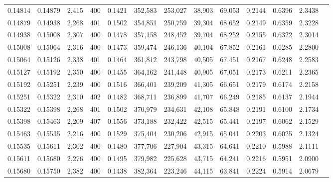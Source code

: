 \begin{tabular}{rrrrrrrrrrrrr}
0.14814 & 0.14879 & 2,415 & 400 &                                     0.1421 & 352,583 & 253,027 &  38,903 &  69,053 & 0.2144 & 0.6396 & 2.3438 \\
0.14879 & 0.14938 & 2,268 & 401 &                                     0.1502 & 354,851 & 250,759 &  39,304 &  68,652 & 0.2149 & 0.6359 & 2.3228 \\
0.14938 & 0.15008 & 2,307 & 400 &                                     0.1478 & 357,158 & 248,452 &  39,704 &  68,252 & 0.2155 & 0.6322 & 2.3014 \\
0.15008 & 0.15064 & 2,316 & 400 &                                     0.1473 & 359,474 & 246,136 &  40,104 &  67,852 & 0.2161 & 0.6285 & 2.2800 \\
0.15064 & 0.15126 & 2,338 & 401 &                                     0.1464 & 361,812 & 243,798 &  40,505 &  67,451 & 0.2167 & 0.6248 & 2.2583 \\
0.15127 & 0.15192 & 2,350 & 400 &                                     0.1455 & 364,162 & 241,448 &  40,905 &  67,051 & 0.2173 & 0.6211 & 2.2365 \\
0.15192 & 0.15251 & 2,239 & 400 &                                     0.1516 & 366,401 & 239,209 &  41,305 &  66,651 & 0.2179 & 0.6174 & 2.2158 \\
0.15251 & 0.15322 & 2,310 & 402 &                                     0.1482 & 368,711 & 236,899 &  41,707 &  66,249 & 0.2185 & 0.6137 & 2.1944 \\
0.15322 & 0.15398 & 2,268 & 401 &                                     0.1502 & 370,979 & 234,631 &  42,108 &  65,848 & 0.2191 & 0.6100 & 2.1734 \\
0.15398 & 0.15463 & 2,209 & 407 &                                     0.1556 & 373,188 & 232,422 &  42,515 &  65,441 & 0.2197 & 0.6062 & 2.1529 \\
0.15463 & 0.15535 & 2,216 & 400 &                                     0.1529 & 375,404 & 230,206 &  42,915 &  65,041 & 0.2203 & 0.6025 & 2.1324 \\
0.15535 & 0.15611 & 2,302 & 400 &                                     0.1480 & 377,706 & 227,904 &  43,315 &  64,641 & 0.2210 & 0.5988 & 2.1111 \\
0.15611 & 0.15680 & 2,276 & 400 &                                     0.1495 & 379,982 & 225,628 &  43,715 &  64,241 & 0.2216 & 0.5951 & 2.0900 \\
0.15680 & 0.15750 & 2,382 & 400 &                                     0.1438 & 382,364 & 223,246 &  44,115 &  63,841 & 0.2224 & 0.5914 & 2.0679 \\

\end{tabular}

